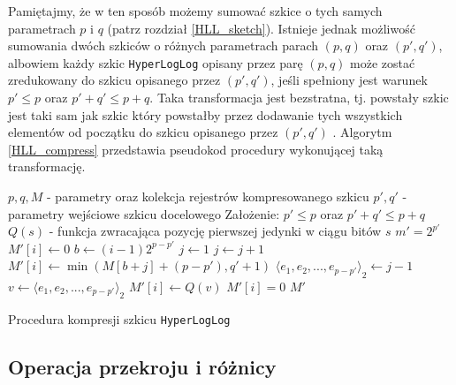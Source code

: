 Pamiętajmy, że w ten sposób możemy sumować szkice o tych samych parametrach $p$ i $q$ (patrz rozdział \ref{HLL_sketch}). Istnieje jednak możliwość sumowania dwóch szkiców o różnych parametrach parach $(p, q)$ oraz $(p',q')$, albowiem każdy szkic \texttt{HyperLogLog} opisany przez parę $(p, q)$ może zostać zredukowany do szkicu opisanego przez $(p', q')$, jeśli spełniony jest warunek $p' \leq p$ oraz $p' + q' \leq p + q$. Taka transformacja jest bezstratna, tj. powstały szkic jest taki sam jak szkic który powstałby przez dodawanie tych wszystkich elementów od początku do szkicu opisanego przez $(p', q')$ \cite{oertl}. Algorytm \ref{HLL_compress} przedstawia pseudokod procedury wykonującej taką transformację.
\begin{algorithm}
	\begin{algorithmic}
		\State $p, q, M $ - parametry oraz kolekcja rejestrów kompresowanego szkicu
		\State $p', q' $ - parametry wejściowe szkicu docelowego
		\State Założenie: $ p' \leq p$ oraz $p' + q' \leq p + q$
		\State $Q(s) $ -  funkcja zwracająca pozycję pierwszej jedynki w ciągu bitów $s$ 
		\newline
		\State $m' = 2^{p'}$
			\State $M'[i] \gets 0$
		\EndFor
			\State $b \gets (i - 1)2^{p-p'}$
			\State $j \gets 1$
				\State $j \gets j + 1$
			\EndWhile
				\State $M'[i] \gets \min(M[b+j] + (p - p'), q' + 1)$
				\State ${{\langle}e_1, e_2, ..., e_{p-p'}{\rangle}}_2 \gets j - 1$
				\State $v \gets {{\langle}e_1, e_2, ..., e_{p-p'}{\rangle}}_2$ 
				\State $M'[i] \gets Q(v)$
			\Else
				\State $M'[i] = 0$
			\EndIf
		\EndFor
		\State \Return $M'$
		\EndFunction
		
	\end{algorithmic}
	\caption{Procedura kompresji szkicu \texttt{HyperLogLog}}
	\label{HLL_compress}
\end{algorithm}

\subsection{Operacja przekroju i różnicy}

